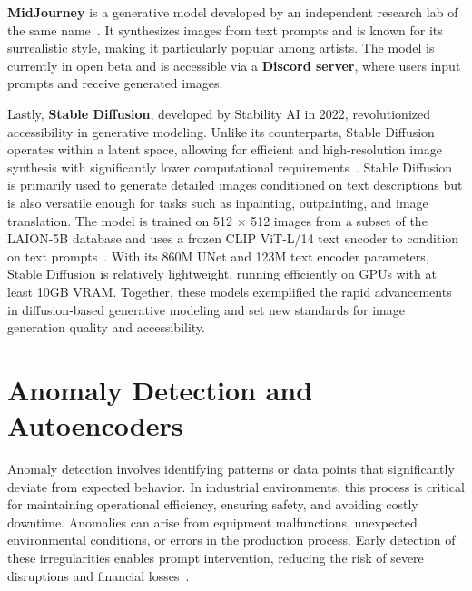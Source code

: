 \documentclass[12pt,DIV14,BCOR12mm,a4paper,footinclude=false,headinclude,parskip=half-,twoside,openright,cleardoublepage=empty,toc=index,bibliography=totoc,listof=totoc]{scrreprt}
\numberwithin{equation}{chapter}
\begin{document}
\textbf{MidJourney} is a generative model developed by an independent research lab of the same name~\cite{midjourney2022}. It synthesizes images from text prompts and is known for its surrealistic style, making it particularly popular among artists. The model is currently in open beta and is accessible via a \textbf{Discord server}, where users input prompts and receive generated images.

Lastly, \textbf{Stable Diffusion}, developed by Stability AI in 2022, revolutionized accessibility in generative modeling. Unlike its counterparts, Stable Diffusion operates within a latent space, allowing for efficient and high-resolution image synthesis with significantly lower computational requirements~\cite{Latent_Diffusion}. Stable Diffusion is primarily used to generate detailed images conditioned on text descriptions but is also versatile enough for tasks such as inpainting, outpainting, and image translation. The model is trained on 512 × 512 images from a subset of the LAION-5B database and uses a frozen CLIP ViT-L/14 text encoder to condition on text prompts~\cite{stable_diffusion}. With its 860M UNet and 123M text encoder parameters, Stable Diffusion is relatively lightweight, running efficiently on GPUs with at least 10GB VRAM. Together, these models exemplified the rapid advancements in diffusion-based generative modeling and set new standards for image generation quality and accessibility.

\section{Anomaly Detection and Autoencoders}

Anomaly detection involves identifying patterns or data points that significantly deviate from expected behavior. In industrial environments, this process is critical for maintaining operational efficiency, ensuring safety, and avoiding costly downtime. Anomalies can arise from equipment malfunctions, unexpected environmental conditions, or errors in the production process. Early detection of these irregularities enables prompt intervention, reducing the risk of severe disruptions and financial losses~\cite{panza2023anomaly}.
\end{document}
